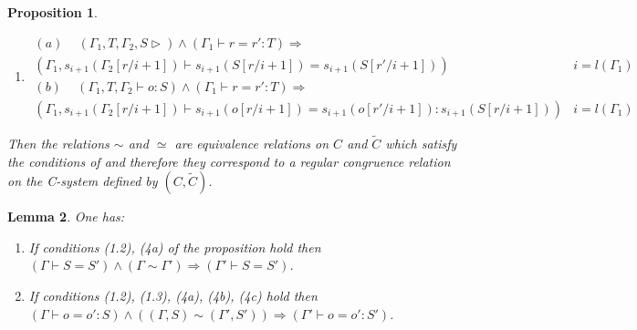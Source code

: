 \documentclass[11pt]{article}
\newtheorem{proposition}{Proposition}[subsection]
\newtheorem{lemma}[proposition]{Lemma}
\newcommand{\llabel}[1]{\label{#1}}
\newcommand{\wt}{\widetilde}
\newcommand{\spc}{{\,\,\,\,\,\,\,}}
\newcommand{\impl}{{\Rightarrow}}
\begin{document}
\begin{proposition}
\begin{enumerate}
$$\begin{array}{ll}
(a)\spc (\Gamma_1,T,\Gamma_2\vdash S=S')\wedge(\Gamma_1\vdash r:T)\impl&\\
(\Gamma_1,s_{i+1}(\Gamma_2[r/i+1])\vdash s_{i+1}(S[r/i+1])=s_{i+1}(S'[r/i+1]))&i=l(\Gamma_1)\\
(b)\spc (\Gamma_1,T,\Gamma_2\vdash o=o':S)\wedge(\Gamma_1\vdash r:T)\impl&\\
(\Gamma_1,s_{i+1}(\Gamma_2[r/i+1])\vdash s_{i+1}(o[r/i+1])=s_{i+1}(o'[r/i+1]):s_{i+1}(S[r/i+1]))&i=l(\Gamma_1)
\end{array}
$$
%
\item 
%
$$
\begin{array}{ll}
(a)\spc (\Gamma_1,T,\Gamma_2,S\rhd)\wedge(\Gamma_1\vdash r=r':T)\impl&\\
(\Gamma_1,s_{i+1}(\Gamma_2[r/i+1])\vdash s_{i+1}(S[r/i+1])=s_{i+1}(S[r'/i+1]))&i=l(\Gamma_1)\\
(b)\spc (\Gamma_1,T,\Gamma_2\vdash o:S)\wedge(\Gamma_1\vdash r=r':T)\impl&\\
(\Gamma_1,s_{i+1}(\Gamma_2[r/i+1])\vdash s_{i+1}(o[r/i+1])=s_{i+1}(o[r'/i+1]):s_{i+1}(S[r/i+1]))&i=l(\Gamma_1)
\end{array}
$$
\end{enumerate}
%
Then the relations $\sim$ and $\simeq$ are equivalence relations on $C$ and $\wt{C}$ which satisfy the conditions of \cite[Proposition 5.4]{Csubsystems} and therefore they correspond to a regular congruence relation on the C-system defined by $(C,\wt{C})$. 
\end{proposition}
%
\begin{lemma}
\llabel{iseqrelsiml1}
One has:
%
\begin{enumerate}
\item If conditions (1.2), (4a) of the proposition hold then $(\Gamma\vdash S=S')\wedge(\Gamma\sim\Gamma')\impl (\Gamma'\vdash S=S')$.
\item If conditions (1.2), (1.3), (4a), (4b), (4c) hold then $(\Gamma\vdash o=o':S)\wedge((\Gamma,S)\sim(\Gamma',S'))\impl (\Gamma'\vdash o=o':S')$.
\end{enumerate}
\end{lemma}
%
\end{document}

